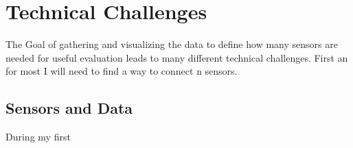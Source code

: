 \chapter*{Technical Challenges}
\label{chap:Technical CHallenges}
\renewcommand{\thesection}{\arabic{section}}
\setcounter{section}{0}

The Goal of gathering and visualizing the data to define how many sensors are needed for useful evaluation leads to many different technical challenges. First an for most I will need to find a way to connect n sensors.


\section{Sensors and Data}

During my first 
